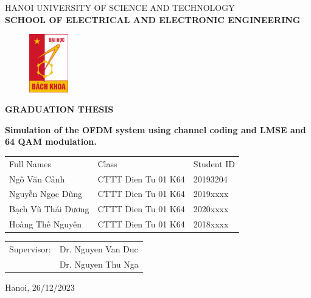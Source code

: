 \thispagestyle{empty}
\begin{center}
\vspace{-12pt} HANOI UNIVERSITY OF SCIENCE AND TECHNOLOGY \\
\textbf{\fontsize{14pt}{0pt}\selectfont SCHOOL OF ELECTRICAL AND ELECTRONIC ENGINEERING}
\vspace{1cm}
 \begin{figure}[H]
     \centering
     \includegraphics[width=0.15\textwidth]{Figures/logoBK.png}
 \end{figure}
\vspace{1cm}
\textbf{\fontsize{25pt}{0pt}\selectfont GRADUATION THESIS}
\vspace{1cm}
\end{center}
\begin{center}
    \textbf{\fontsize{21pt}{0pt}\selectfont Simulation of the OFDM system using channel coding and LMSE and 64 QAM modulation. }
\vspace{7pt}
\begin{table}[H]
    \centering
    \begin{tabular}{l l l}
        Full Names & Class & Student ID \\
        Ngô Văn Cảnh & CTTT Dien Tu 01 K64 & 20193204 \\
        Nguyễn Ngọc Dũng & CTTT Dien Tu 01 K64 & 2019xxxx \\
        Bạch Vũ Thái Dương & CTTT Dien Tu 01 K64 & 2020xxxx \\
        Hoàng Thế Nguyên & CTTT Dien Tu 01 K64 & 2018xxxx \\
    \end{tabular}
\end{table}
\vspace{1.5cm}
\begin{table}[H]
    \centering
    \begin{tabular}{l l}
        \fontsize{14pt}{0pt}\selectfont Supervisor: & \fontsize{14pt}{0pt}\selectfont Dr. Nguyen Van Duc \\
        {} & Dr. Nguyen Thu Nga \hspace{5pt} \\
    \end{tabular}
\end{table}
\vspace{1.5cm}
\fontsize{14pt}{0pt}\selectfont Hanoi, 26/12/2023
\end{center}

